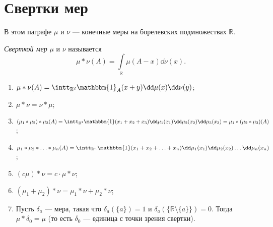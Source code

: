 \section{Свертки мер}

    В этом паграфе $\mu$ и $\nu$ --- конечные меры на борелевских подмножествах $\mathbb{R}$.
    
     \begin{definition} \textit{Сверткой мер} $\mu$ и $\nu$ называется
         $$\mu * \nu(A) = \int\limits_\mathbb{R} \mu(A - x) \dd\nu(x).$$
     \end{definition}

     \begin{properties}
    \enewline
         \begin{enumerate}

             \item $\mu * \nu(A) = \intt_{\mathbb{R}^2}\mathbbm{1}_{A}(x+y) \dd\mu(x)\dd\nu(y)$;

             \item $\mu*\nu = \nu*\mu$;

             \item $(\mu_1*\mu_2)*\mu_3 (A)  = \intt_{\mathbb{R}^3}\mathbbm{1}(x_1+x_2+x_3)\dd\mu_1(x_1)\dd\mu_2(x_2)\dd\mu_3(x_3) = \mu_1*(\mu_2*\mu_3) (A)$;

             \item $\mu_1*\mu_2*\ldots*\mu_n (A)  = \intt_{\mathbb{R}^n}\mathbbm{1}(x_1+x_2+\ldots +x_n)\dd\mu_1(x_1)\dd\mu_2(x_2)\ldots \dd\mu_n(x_n)$;

             \item $(c\mu)*\nu = c\cdot\mu*\nu$;

             \item $(\mu_1+\mu_2)*\nu = \mu_1 * \nu + \mu_2 * \nu$;

             \item Пусть $\delta_a$ --- мера, такая что $\delta_a(\{a\}) = 1$ и $\delta_a(\{\mathbb{R}\setminus \{a\}\}) = 0$. Тогда
                   $\mu*\delta_0 = \mu$ (то есть $\delta_0$ --- единица с точки зрения свертки).

                   
         \end{enumerate}
     \end{properties}
     
